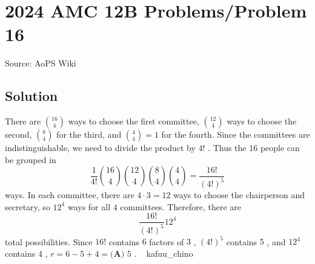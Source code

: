 \documentclass[12pt]{article}
\begin{document}
\section*{{2024 AMC 12B Problems/Problem 16}}
Source: AoPS Wiki

\subsection*{Solution}
There are ${16 \choose 4}$ ways to choose the first committee, ${12 \choose 4}$ ways to choose the second, ${8 \choose 4}$ for the third, and ${4 \choose 4}=1$ for the fourth. Since the committees are indistinguishable, we need to divide the product by $4!$ . Thus the $16$ people can be grouped in \[\frac{1}{4!}{16 \choose 4}{12 \choose 4}{8 \choose 4}{4 \choose 4}=\frac{16!}{(4!)^5}\] ways. In each committee, there are $4 \cdot 3=12$ ways to choose the chairperson and secretary, so $12^4$ ways for all $4$ committees. Therefore, there are \[\frac{16!}{(4!)^5}12^4\] total possibilities. Since $16!$ contains $6$ factors of $3$ , $(4!)^5$ contains $5$ , and $12^4$ contains $4$ , $r=6-5+4=\boxed{\textbf{(A) }5}$ . ~ kafuu_chino
\end{document}
